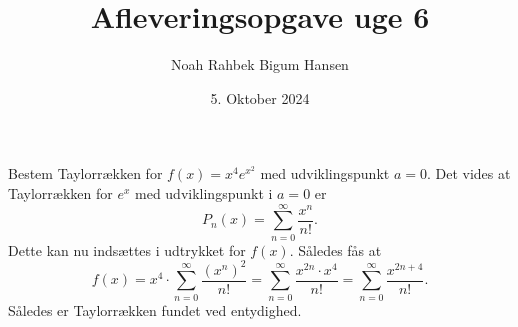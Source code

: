\documentclass[12pt]{article}
\title{Afleveringsopgave uge 6}
\author{Noah Rahbek Bigum Hansen}
\date{5. Oktober 2024}
\begin{document}
\maketitle

Bestem Taylorrækken for $f(x)=x^4e^{x^2}$ med udviklingspunkt $a=0$.
\bigbreak
Det vides at Taylorrækken for $e^x$ med udviklingspunkt i $a=0$ er 
\[
P_n(x) = \sum_{n=0}^{\infty} \frac{x^n}{n!}
.\] 
Dette kan nu indsættes i udtrykket for $f(x)$. Således fås at
\[
f(x) = x^4\cdot \sum_{n=0}^{\infty} \frac{(x^n)^2}{n!} = \sum_{n=0}^{\infty} \frac{x^{2n}\cdot x^4}{n!} = \sum_{n=0}^{\infty} \frac{x^{2n+4}}{n!}
.\] 
Således er Taylorrækken fundet ved entydighed.
\end{document}
